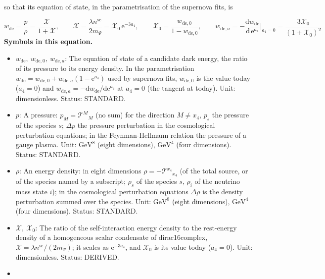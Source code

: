 \documentclass[
  10pt,
]{article}
\providecommand{\tightlist}{%
  \setlength{\itemsep}{0pt}\setlength{\parskip}{0pt}}
\begin{document}
so that its equation of state, in the parametrisation of the supernova
fits, is

\[ w_{\mathrm{de}} = \frac{p}{\rho} = \frac{\mathcal{X}}{1 + \mathcal{X}},\qquad \mathcal{X} = \frac{\lambda n^{\mathrm{sc}}}{2m_\Psi} = \mathcal{X}_0\,\mathrm{e}^{-3a_4},\qquad \mathcal{X}_0 = \frac{w_{\mathrm{de},0}}{1 - w_{\mathrm{de},0}},\qquad w_{\mathrm{de},a} = -\frac{\mathrm{d}w_{\mathrm{de}}}{\mathrm{d}\,\mathrm{e}^{a_4}}\Big\vert_{a_4 = 0} = \frac{3\mathcal{X}_0}{(1 + \mathcal{X}_0)^2} \]
\textbf{Symbols in this equation.}

\begin{itemize}
\tightlist
\item
  \(w_{\mathrm{de}},\ w_{\mathrm{de},0},\ w_{\mathrm{de},a}\): The
  equation of state of a candidate dark energy, the ratio of its
  pressure to its energy density. In the parametrisation
  \(w_{\mathrm{de}} = w_{\mathrm{de},0} + w_{\mathrm{de},a}(1 - \mathrm{e}^{a_4})\)
  used by supernova fits, \(w_{\mathrm{de},0}\) is the value today
  (\(a_4 = 0\)) and
  \(w_{\mathrm{de},a} = -\mathrm{d}w_{\mathrm{de}}/\mathrm{d}\mathrm{e}^{a_4}\)
  at \(a_4 = 0\) (the tangent at today). Unit: dimensionless. Status:
  STANDARD.
\item
  \(p\): A pressure: \(p_M = \mathcal{T}^M{}_M\) (no sum) for the
  direction \(M \ne x_4\), \(p_s\) the pressure of the species \(s\);
  \(\Delta p\) the pressure perturbation in the cosmological
  perturbation equations; in the Feynman-Hellmann relation the pressure
  of a gauge plasma. Unit: \(\mathrm{GeV}^{8}\) (eight dimensions),
  \(\mathrm{GeV}^{4}\) (four dimensions). Status: STANDARD.
\item
  \(\rho\): An energy density: in eight dimensions
  \(\rho = -\mathcal{T}^{x_4}{}_{x_4}\) (of the total source, or of the
  species named by a subscript; \(\rho_s\) of the species \(s\),
  \(\rho_i\) of the neutrino mass state \(i\)); in the cosmological
  perturbation equations \(\Delta\rho\) is the density perturbation
  summed over the species. Unit: \(\mathrm{GeV}^{8}\) (eight
  dimensions), \(\mathrm{GeV}^{4}\) (four dimensions). Status: STANDARD.
\item
  \(\mathcal{X},\ \mathcal{X}_0\): The ratio of the self-interaction
  energy density to the rest-energy density of a homogeneous scalar
  condensate of dirac16complex,
  \(\mathcal{X} = \lambda n^{\mathrm{sc}}/(2m_\Psi)\); it scales as
  \(\mathrm{e}^{-3a_4}\), and \(\mathcal{X}_0\) is its value today
  (\(a_4 = 0\)). Unit: dimensionless. Status: DERIVED.
\item

\end{itemize}
\end{document}

